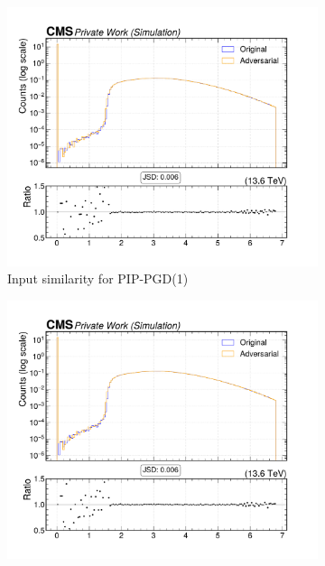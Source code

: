 \begin{figure}[htbp]
  \centering
  \begin{subfigure}[t]{0.32\textwidth}
    \includegraphics[width=\linewidth]{media/output/features/compare/combined_it_1/cmp_cpf_arr_Cpfcan_BtagPf_trackEtaRel.pdf}
    \caption*{Input similarity for PIP-PGD(1)}
  \end{subfigure}\hfill
  \begin{subfigure}[t]{0.32\textwidth}
    \includegraphics[width=\linewidth]{media/output/features/compare/combined_it_2/cmp_cpf_arr_Cpfcan_BtagPf_trackEtaRel.pdf}

\end{subfigure}
\end{figure}
